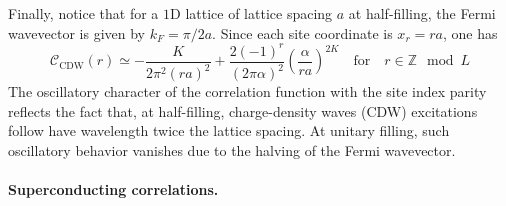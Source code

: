 Finally, notice that for a $1$D lattice of lattice spacing $a$ at half-filling, the Fermi wavevector is given by $k_F = \pi/2a$. Since each site coordinate is $x_r=ra$, one has
\[
	\mathcal{C}_\mathrm{CDW}(r) \simeq - \frac{K}{2\pi^2 (ra)^2} +  \frac{2 (-1)^r }{(2\pi\alpha)^2} \left(
	\frac{\alpha}{ra}
	\right)^{2K}
	\quad\text{for}\quad
	r \in \mathbb{Z} \mod L
\]
The oscillatory character of the correlation function with the site index parity reflects the fact that, at half-filling, charge-density waves (CDW) excitations follow have wavelength twice the lattice spacing. At unitary filling, such oscillatory behavior vanishes due to the halving of the Fermi wavevector.

\paragraph{Superconducting correlations.}

\todo